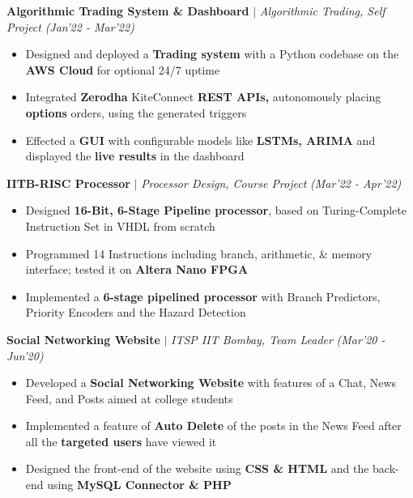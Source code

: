 \documentclass[10.2pt]{article}
\begin{document}
\vspace{-6pt}
    \textbf{Algorithmic Trading System \& Dashboard} $|$  \textit{Algorithmic Trading, Self Project} \hfill{\sl \small (Jan’22 - Mar’22)} \\
    \vspace{-0.3cm}
    \hline 
    \vspace{-4pt}    
\begin{itemize}[label={\textbullet},itemsep = -1 mm, leftmargin=*]
    \item Designed and deployed a \textbf{Trading system} with a Python codebase on the \textbf{AWS Cloud} for optional 24/7 uptime
    \item Integrated \textbf{Zerodha} KiteConnect \textbf{REST APIs,} autonomously placing \textbf{options} orders, using the generated triggers
    \item Effected a \textbf{GUI} with configurable models like\textbf{ LSTMs, ARIMA} and displayed the \textbf{live results} in the dashboard 
\end{itemize}
\vspace{-6pt}
     \textbf{IITB-RISC Processor} $|$  \textit{Processor Design, Course Project} \hfill{\sl \small (Mar’22 - Apr’22)} \\
    \vspace{-0.3cm}
    \hline 
    \vspace{-4pt}    
\begin{itemize}[label={\textbullet},itemsep = -1 mm, leftmargin=*]
    \item Designed \textbf{16-Bit, 6-Stage Pipeline processor}, based on Turing-Complete Instruction Set in VHDL from scratch
    \item Programmed 14 Instructions including branch, arithmetic, \& memory interface; tested it on \textbf{Altera Nano FPGA}
    \item Implemented a \textbf{6-stage pipelined processor} with Branch Predictors, Priority Encoders and the Hazard Detection
\end{itemize}
\vspace{-6pt}
\textbf{Social Networking Website} $|$  \textit{ITSP IIT Bombay, Team Leader} \hfill{\sl \small (Mar'20 - Jun'20)} \\
    \vspace{-0.3cm}
    \hline 
    \vspace{-4pt}    
\begin{itemize}[label={\textbullet},itemsep = -1 mm, leftmargin=*]
    \item Developed a \textbf{Social Networking Website} with features of a Chat, News Feed, and Posts aimed at college students
    \item Implemented a feature of \textbf{Auto Delete} of the posts in the News Feed after all the \textbf{targeted users} have viewed it
    \item Designed the front-end of the website using \textbf{CSS \& HTML} and the back-end using \textbf{MySQL Connector \& PHP}
\end{itemize}
\newpage
\end{document}
